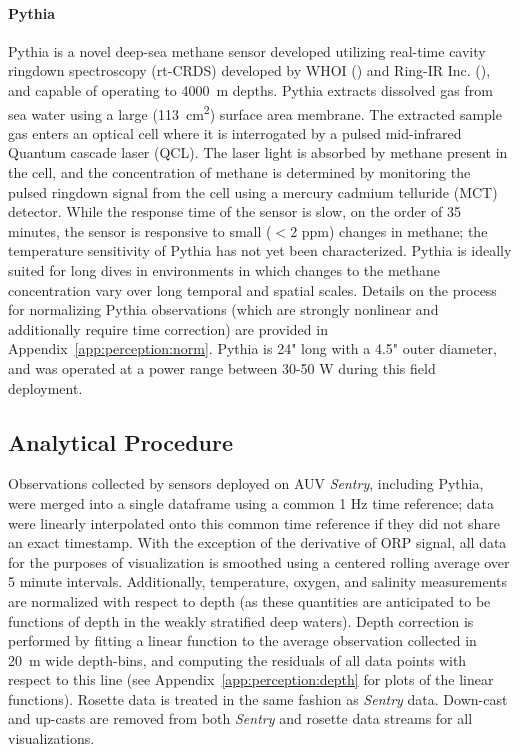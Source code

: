 \paragraph{Pythia}
\label{sec:nopp}
Pythia is a novel deep-sea methane sensor developed utilizing real-time cavity ringdown spectroscopy (rt-CRDS) developed by WHOI (\cite{michel2022gas}) and Ring-IR Inc. (\cite{Harb:12}), and capable of operating to \SI{4000}{\meter} depths. Pythia extracts dissolved gas from sea water using a large (\SI{113}{\centi\meter\squared}) surface area membrane. The extracted sample gas enters an optical cell where it is interrogated by a pulsed mid-infrared Quantum cascade laser (QCL). The laser light is absorbed by methane present in the cell, and the concentration of methane is determined by monitoring the pulsed ringdown signal from the cell using a mercury cadmium telluride (MCT) detector. While the response time of the sensor is slow, on the order of 35 minutes, the sensor is responsive to small ($<$2 ppm) changes in methane; the temperature sensitivity of Pythia has not yet been characterized. Pythia is ideally suited for long dives in environments in which changes to the methane concentration vary over long temporal and spatial scales. Details on the process for normalizing Pythia observations (which are strongly nonlinear and additionally require time correction) are provided in Appendix~\ref{app:perception:norm}. Pythia is 24" long with a 4.5" outer diameter, and was operated at a power range between 30-50 W during this field deployment.

\subsection{Analytical Procedure}
\label{sec:analytical}
Observations collected by sensors deployed on AUV \emph{Sentry}, including Pythia, were merged into a single dataframe using a common 1 Hz time reference; data were linearly interpolated onto this common time reference if they did not share an exact timestamp. With the exception of the derivative of ORP signal, all data for the purposes of visualization is smoothed using a centered rolling average over 5 minute intervals. Additionally, temperature, oxygen, and salinity measurements are normalized with respect to depth (as these quantities are anticipated to be functions of depth in the weakly stratified deep waters). Depth correction is performed by fitting a linear function to the average observation collected in \SI{20}{\meter} wide depth-bins, and computing the residuals of all data points with respect to this line (see Appendix~\ref{app:perception:depth} for plots of the linear functions). Rosette data is treated in the same fashion as \emph{Sentry} data. Down-cast and up-casts are removed from both \emph{Sentry} and rosette data streams for all visualizations.

